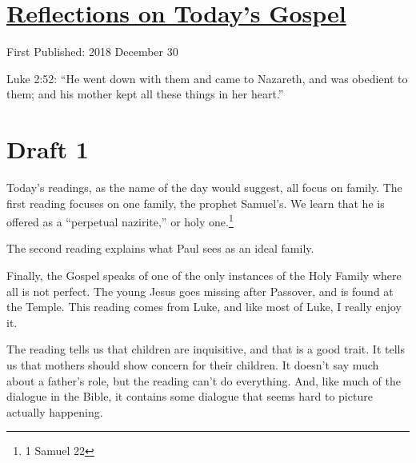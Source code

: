 \documentclass[12pt]{article}[titlepage]
\newcommand{\say}[1]{``#1''}
\newcommand{\1}{\={a}}
\newcommand{\2}{\={e}}
\newcommand{\3}{\={\i}}
\newcommand{\4}{\=o}
\newcommand{\5}{\=u}
\newcommand{\6}{\={A}}
\renewcommand{\,}{\textsuperscript{,}}
\begin{document}
\doublespacing
\section{\href{reflections-on-readings-holy-family-c.html}{Reflections on Today's Gospel}}
First Published: 2018 December 30

Luke 2:52: \say{He went down with them and came to Nazareth, and was obedient to them; and his mother kept all these things in her heart.}

\section{Draft 1}
Today's readings, as the name of the day would suggest, all focus on family. The first reading focuses on one family, the prophet Samuel's. We learn that he is offered as a \say{perpetual nazirite,} or holy one.\footnote{1 Samuel 22}

The second reading explains what Paul sees as an ideal family.

Finally, the Gospel speaks of one of the only instances of the Holy Family where all is not perfect. The young Jesus goes missing after Passover, and is found at the Temple. This reading comes from Luke, and like most of Luke, I really enjoy it.

The reading tells us that children are inquisitive, and that is a good trait. It tells us that mothers should show concern for their children. It doesn't say much about a father's role, but the reading can't do everything. And, like much of the dialogue in the Bible, it contains some dialogue that seems hard to picture actually happening.
\end{document}
